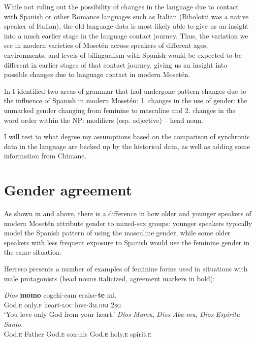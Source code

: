 \documentclass[output=paper,colorlinks,citecolor=brown
]{langscibook}
\begin{document}
While not ruling out the possibility of changes in the language due to contact with Spanish or other Romance languages such as Italian (Bibolotti was a native speaker of Italian), the old language data is most likely able to give us an insight into a much earlier stage in the language contact journey. Thus, the variation we see in modern varieties of Mosetén across speakers of different ages, environments, and levels of bilingualism with Spanish would be expected to be different in earlier stages of that contact journey, giving us an insight into possible changes due to language contact in modern Mosetén.

In \citet{sakel2007moseten} I identified two areas of grammar that had undergone pattern changes due to the influence of Spanish in modern Mosetén: 1. changes in the use of gender: the unmarked gender changing from feminine to masculine and 2. changes in the word order within the NP: modifiers (esp. adjective) – head noun.

I will test to what degree my assumptions based on the comparison of synchronic data in the language are backed up by the historical data, as well as adding some information from Chimane.

\section{Gender agreement}
\begin{sloppypar}
As shown in  and  above, there is a difference in how older and younger speakers of modern Mosetén attribute gender to mixed-sex groups: younger speakers typically model the Spanish pattern of using the masculine gender, while some older speakers with less frequent exposure to Spanish would use the feminine gender in the same situation.
\end{sloppypar}

Herrero  presents a number of examples of feminine forms used in situations with male protagonists (head nouns italicized, agreement markers in bold):

\ea \label{sakel_example_6}
\gll \emph{Dios} 	\textbf{momo}	cogchi-cam 	eraise-\textbf{te} 	mi.\\
     God.\textsc{e}	only.\textsc{f}	heart-\textsc{loc}	love-3\textsc{m.obj}	2\textsc{sg}\\
\glt ‘You love only God from your heart.’
\ex \label{sakel_example_7}
\gll \emph{Dios} \emph{Mumu}, 	\emph{Dios} \emph{Aba-mu},	\emph{Dios} \emph{Espiritu} \emph{Santo}.\\
     God.\textsc{e} Father	God.\textsc{e} son-his	God.\textsc{e} holy.\textsc{e} spirit.\textsc{e}\\
     
\end{document}
